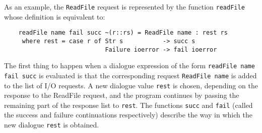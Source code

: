 As an example, the \verb"ReadFile" request  is  represented  by  the  function
\verb"readFile" whose definition is equivalent to:
\begin{verbatim}
    readFile name fail succ ~(r::rs) = ReadFile name : rest rs
     where rest = case r of Str s           -> succ s
                            Failure ioerror -> fail ioerror
\end{verbatim}
The first thing to happen  when  a  dialogue  expression  of  the  form
\verb"readFile name fail succ"  is  evaluated  is  that  the  corresponding
request \verb"ReadFile name" is added to the list of I/O  requests.   A  new
dialogue value \verb"rest" is chosen,  depending  on  the  response  to  the
ReadFile request, and the program continues by  passing  the  remaining
part of the response list to \verb"rest".  
The functions \verb"succ"  and  \verb"fail"
(called the success and failure  continuations  respectively)  describe
the way in which the new dialogue \verb"rest" is obtained.

